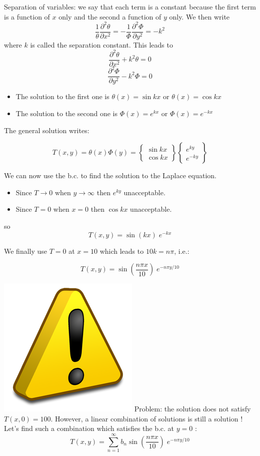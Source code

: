 Separation of variables: we say that each term is a constant because the first term is a function of $x$ only
and the second a function of $y$ only.
We then write
\[
\frac{1}{\theta} \frac{\partial^2 \theta}{\partial x^2} = - \frac{1}{\Phi} \frac{\partial^2 \Phi}{\partial y^2} = -k^2
\]
where $k$ is called the separation constant.
This leads to 
\[
\frac{\partial^2 \theta}{\partial x^2} + k^2 \theta = 0
\]
\[
\frac{\partial^2 \Phi}{\partial y^2} - k^2 \Phi =0
\]

\begin{itemize}
\item The solution to the first one is $\theta(x)=\sin kx$ or $\theta(x)=\cos kx$
\item The solution to the second one is $\Phi(x)=e^{kx}$ or $\Phi(x)=e^{-kx}$
\end{itemize}


The general solution writes:

\[
T(x,y)=\theta(x) \Phi(y)=
\left\{
\begin{array}{c}
\sin kx \\ \cos kx
\end{array}
\right\}
\left\{
\begin{array}{c}
e^{ky} \\ e^{-ky}
\end{array}
\right\}
\]

We can now use the b.c. to find the solution to the Laplace equation.

\begin{itemize}
\item Since $T\rightarrow 0$ when $y\rightarrow \infty$ then $e^{ky}$ unacceptable.
\item Since $T=0$ when $x=0$ then $\cos kx$ unacceptable.
\end{itemize}

so
\[
T(x,y)=
\sin (kx)  \;
 e^{-kx}
\]

We finally use $T=0$ at $x=10$ which leads to $10k=n \pi$, i.e.:

\[
T(x,y)=\sin (\frac{n\pi x}{10}) \;   e^{-n\pi y/10}
\]

\includegraphics[width=.5cm]{images/benchmark_lapplate/warning.png}
Problem: the solution does not satisfy  $T(x,0)=100$.
However, a linear combination of solutions is still a solution !
Let's find such a combination which satisfies the b.c. at $y=0$ :
\[
T(x,y) = \sum_{n=1}^\infty b_n \sin (\frac{n\pi x}{10}) \;   e^{-n\pi y/10}
\]

